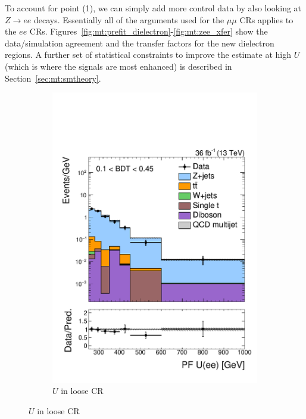 To account for point (1), we can simply add more control data by also looking at $Z\rightarrow ee$ decays.
Essentially all of the arguments used for the $\mu\mu$ CRs applies to the $ee$ CRs.
Figures~\ref{fig:mt:prefit_dielectron}-\ref{fig:mt:zee_xfer} show the data/simulation agreement and the transfer factors for the new dielectron regions.
A further set of statistical constraints to improve the estimate at high $U$ (which is where the signals are most enhanced) is described in Section~\ref{sec:mt:smtheory}.

\begin{figure}[]
    \begin{center}
        \begin{subfigure}[t]{0.32\textwidth}
            \includegraphics[width=\textwidth]{figures/monotop/prefit/dielectron_loose_pfUZmag_logy.pdf}
            \caption{$U$ in loose CR}
        \end{subfigure}

\end{center}
\end{figure}
